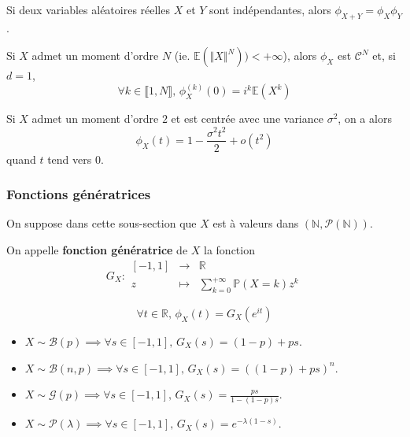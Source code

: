   \begin{corollary}
    Si deux variables aléatoires réelles $X$ et $Y$ sont indépendantes, alors $\phi_{X+Y} = \phi_X \phi_Y$.
  \end{corollary}

  \begin{theorem}
    Si $X$ admet un moment d'ordre $N$ (ie. $\mathbb{E}(\Vert X \Vert^N)) < +\infty$), alors $\phi_X$ est $\mathcal{C}^N$ et, si $d = 1$,
    \[ \forall k \in \llbracket 1, N \rrbracket, \, \phi_X^{(k)}(0) = i^k \mathbb{E}(X^k) \]
  \end{theorem}

  \begin{example}
    Si $X$ admet un moment d'ordre $2$ et est centrée avec une variance $\sigma^2$, on a alors
    \[ \phi_X(t) = 1 - \frac{\sigma^2 t^2}{2} + o(t^2) \]
    quand $t$ tend vers $0$.
  \end{example}

  \subsubsection{Fonctions génératrices}

  On suppose dans cette sous-section que $X$ est à valeurs dans $(\mathbb{N}, \mathcal{P}(\mathbb{N}))$.


  \begin{definition}
    On appelle \textbf{fonction génératrice} de $X$ la fonction
    \[
    G_X :
    \begin{array}{ccc}
      [-1,1] &\rightarrow& \mathbb{R} \\
      z &\mapsto& \sum_{k=0}^{+\infty} \mathbb{P}(X=k) z^k
    \end{array}
    \]
  \end{definition}


  \begin{remark}
    \[ \forall t \in \mathbb{R}, \, \phi_X(t) = G_X(e^{it}) \]
  \end{remark}


  \begin{example}
    \begin{itemize}
      \item $X \sim \mathcal{B}(p) \implies \forall s \in [-1,1], \, G_X(s) = (1-p) + ps$.
      \item $X \sim \mathcal{B}(n, p) \implies \forall s \in [-1,1], \, G_X(s) = ((1-p) + ps)^n$.
      \item $X \sim \mathcal{G}(p) \implies \forall s \in [-1,1], \, G_X(s) = \frac{ps}{1-(1-p)s}$.
      \item $X \sim \mathcal{P}(\lambda) \implies \forall s \in [-1,1], \, G_X(s) = e^{-\lambda (1-s)}$.
    \end{itemize}
  \end{example}

